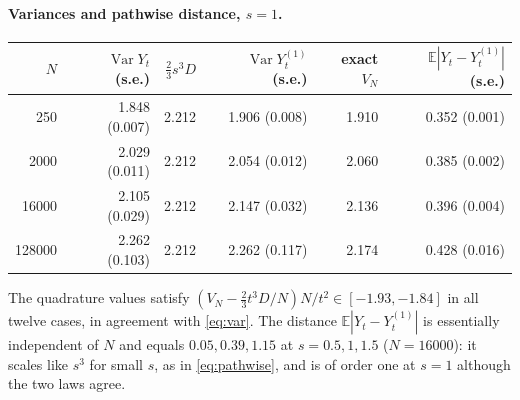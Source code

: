 \documentclass[11pt]{article}
\newcommand{\E}{\mathbb{E}}
\theoremstyle{remark}
\begin{document}
\paragraph{Variances and pathwise distance, $s=1$.}
\begin{center}
\begin{tabular}{rrrrrr}
 $N$ & $\operatorname{Var}Y_t$ (s.e.) & $\tfrac23s^3D$ &
 $\operatorname{Var}Y^{(1)}_t$ (s.e.) & exact $V_N$ & $\E|Y_t-Y^{(1)}_t|$ (s.e.)\\ \hline
 250 & 1.848 (0.007) & 2.212 & 1.906 (0.008) & 1.910 & 0.352 (0.001)\\
 2000 & 2.029 (0.011) & 2.212 & 2.054 (0.012) & 2.060 & 0.385 (0.002)\\
 16000 & 2.105 (0.029) & 2.212 & 2.147 (0.032) & 2.136 & 0.396 (0.004)\\
 128000 & 2.262 (0.103) & 2.212 & 2.262 (0.117) & 2.174 & 0.428 (0.016)\\
\end{tabular}
\end{center}
The quadrature values satisfy $(V_N-\tfrac23t^3D/N)N/t^2\in[-1.93,-1.84]$
in all twelve cases, in agreement with \eqref{eq:var}. The distance
$\E|Y_t-Y^{(1)}_t|$ is essentially independent of $N$ and equals
$0.05,0.39,1.15$ at $s=0.5,1,1.5$ ($N=16000$): it scales like $s^3$ for
small $s$, as in \eqref{eq:pathwise}, and is of order one at $s=1$ although
the two laws agree.
\end{document}

